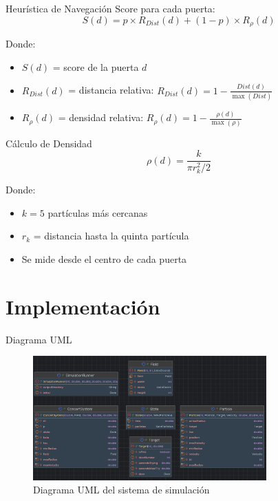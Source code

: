 \documentclass[aspectratio=169]{beamer}
\begin{document}
\begin{frame}{Heurística de Navegación}
    Score para cada puerta:
    \begin{equation}
        S(d) = p \times R_{Dist}(d) + (1-p) \times R_\rho(d)
    \end{equation}
    
    Donde:
    \begin{itemize}
        \item $S(d)$ = score de la puerta $d$
        \item $R_{Dist}(d)$ = distancia relativa: $R_{Dist}(d) = 1 - \frac{Dist(d)}{\max(Dist)}$
        \item $R_\rho(d)$ = densidad relativa: $R_\rho(d) = 1 - \frac{\rho(d)}{\max(\rho)}$
    \end{itemize}
\end{frame}

\begin{frame}{Cálculo de Densidad}
    \begin{equation}
        \rho(d) = \frac{k}{\pi r_k^2/2}
    \end{equation}
    
    Donde:
    \begin{itemize}
        \item $k=5$ partículas más cercanas
        \item $r_k$ = distancia hasta la quinta partícula
        \item Se mide desde el centro de cada puerta
    \end{itemize}
\end{frame}
\section{Implementación}

\begin{frame}{Diagrama UML}
    \begin{figure}
        \centering
        \includegraphics[width=0.8\textwidth]{img/UML.jpg}
        \caption{Diagrama UML del sistema de simulación}
    \end{figure}
\end{frame}
\end{document}
